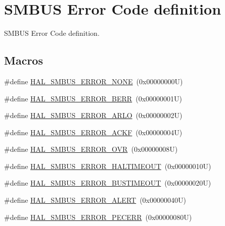 \hypertarget{group___s_m_b_u_s___error___code__definition}{}\section{S\+M\+B\+US Error Code definition}
\label{group___s_m_b_u_s___error___code__definition}


S\+M\+B\+US Error Code definition.  


\subsection*{Macros}
\begin{DoxyCompactItemize}
\item 
\#define \hyperlink{group___s_m_b_u_s___error___code__definition_gaf1347759443510417c693350bea020dd}{H\+A\+L\+\_\+\+S\+M\+B\+U\+S\+\_\+\+E\+R\+R\+O\+R\+\_\+\+N\+O\+NE}~(0x00000000\+U)
\item 
\#define \hyperlink{group___s_m_b_u_s___error___code__definition_ga748dcfd7bf82832e4be95ef863023caf}{H\+A\+L\+\_\+\+S\+M\+B\+U\+S\+\_\+\+E\+R\+R\+O\+R\+\_\+\+B\+E\+RR}~(0x00000001\+U)
\item 
\#define \hyperlink{group___s_m_b_u_s___error___code__definition_ga031e3e9ed49b890fee48da9a2c1f5429}{H\+A\+L\+\_\+\+S\+M\+B\+U\+S\+\_\+\+E\+R\+R\+O\+R\+\_\+\+A\+R\+LO}~(0x00000002\+U)
\item 
\#define \hyperlink{group___s_m_b_u_s___error___code__definition_ga1e29671c15e4e841dea9dfdffe8c26fe}{H\+A\+L\+\_\+\+S\+M\+B\+U\+S\+\_\+\+E\+R\+R\+O\+R\+\_\+\+A\+C\+KF}~(0x00000004\+U)
\item 
\#define \hyperlink{group___s_m_b_u_s___error___code__definition_gabed68de5f752d9a033db72f18fead376}{H\+A\+L\+\_\+\+S\+M\+B\+U\+S\+\_\+\+E\+R\+R\+O\+R\+\_\+\+O\+VR}~(0x00000008\+U)
\item 
\#define \hyperlink{group___s_m_b_u_s___error___code__definition_gad224e88fec7c2b8a40f7be7fead7d47a}{H\+A\+L\+\_\+\+S\+M\+B\+U\+S\+\_\+\+E\+R\+R\+O\+R\+\_\+\+H\+A\+L\+T\+I\+M\+E\+O\+UT}~(0x00000010\+U)
\item 
\#define \hyperlink{group___s_m_b_u_s___error___code__definition_gaaf225fb754da51c1767c46edc91c1a0b}{H\+A\+L\+\_\+\+S\+M\+B\+U\+S\+\_\+\+E\+R\+R\+O\+R\+\_\+\+B\+U\+S\+T\+I\+M\+E\+O\+UT}~(0x00000020\+U)
\item 
\#define \hyperlink{group___s_m_b_u_s___error___code__definition_gaea85c97e9cba0fe6f039a2426503812a}{H\+A\+L\+\_\+\+S\+M\+B\+U\+S\+\_\+\+E\+R\+R\+O\+R\+\_\+\+A\+L\+E\+RT}~(0x00000040\+U)
\item 
\#define \hyperlink{group___s_m_b_u_s___error___code__definition_ga96a2ce406544e21aa2df2f5d16ec6eda}{H\+A\+L\+\_\+\+S\+M\+B\+U\+S\+\_\+\+E\+R\+R\+O\+R\+\_\+\+P\+E\+C\+E\+RR}~(0x00000080\+U)
\end{DoxyCompactItemize}


